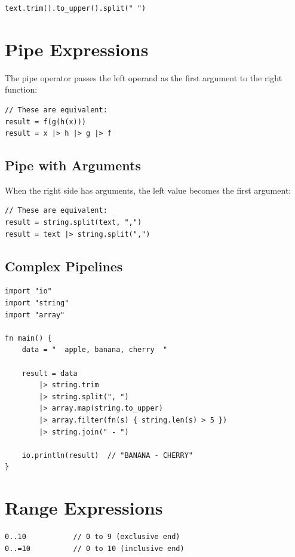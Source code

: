 \begin{lstlisting}
text.trim().to_upper().split(" ")
\end{lstlisting}

\section{Pipe Expressions}

The pipe operator \code{|>} passes the left operand as the first argument to the right function:

\begin{lstlisting}
// These are equivalent:
result = f(g(h(x)))
result = x |> h |> g |> f
\end{lstlisting}

\subsection{Pipe with Arguments}

When the right side has arguments, the left value becomes the first argument:

\begin{lstlisting}
// These are equivalent:
result = string.split(text, ",")
result = text |> string.split(",")
\end{lstlisting}

\subsection{Complex Pipelines}

\begin{lstlisting}
import "io"
import "string"
import "array"

fn main() {
    data = "  apple, banana, cherry  "

    result = data
        |> string.trim
        |> string.split(", ")
        |> array.map(string.to_upper)
        |> array.filter(fn(s) { string.len(s) > 5 })
        |> string.join(" - ")

    io.println(result)  // "BANANA - CHERRY"
}
\end{lstlisting}

\section{Range Expressions}

\begin{lstlisting}
0..10           // 0 to 9 (exclusive end)
0..=10          // 0 to 10 (inclusive end)
\end{lstlisting}

